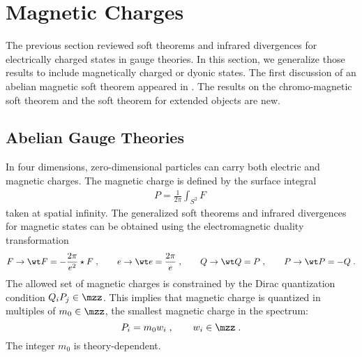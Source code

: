 \documentclass[11pt]{article}
\begin{document}
\section{Magnetic Charges}\label{sec:MagSoft}


The previous section reviewed soft theorems and infrared divergences for electrically charged states in gauge theories. In this section, we generalize those results to include magnetically charged or dyonic states. The first discussion of an abelian magnetic soft theorem appeared in \cite{Strominger:2015bla}. The results on the chromo-magnetic soft theorem and the soft theorem for extended objects are new. 


\subsection{Abelian Gauge Theories}
\label{Sec:MagSoft}

In four dimensions, zero-dimensional particles can carry both electric and magnetic charges. The magnetic charge is defined by the surface integral
\begin{equation}
\begin{split}
P = \frac{1}{2\pi} \int_{S^2} F \;  
\end{split}
\end{equation}
taken at spatial infinity. The generalized soft theorems and infrared divergences for magnetic states can be obtained using the electromagnetic duality transformation 
\begin{equation}
\begin{split}\label{EMduality}
F \to {\wt F} = - \frac{2\pi}{e^2} \star F \; , \qquad e \to {\wt e} = \frac{2\pi}{e}\;  , \qquad Q \to {\wt Q} = P  \; , \qquad P \to {\wt P} = - Q\; . 
\end{split}
\end{equation}
The allowed set of magnetic charges is constrained by the Dirac quantization condition $Q_i P_j  \in \mzz$. This implies that magnetic charge is quantized in multiples of $m_0\in\mzz$,  the smallest magnetic charge in the spectrum:
\begin{equation}
P_i = m_0 w_i \; , \qquad w_i \in \mzz \; .
\end{equation}
The integer $m_0$ is theory-dependent.
\end{document}
